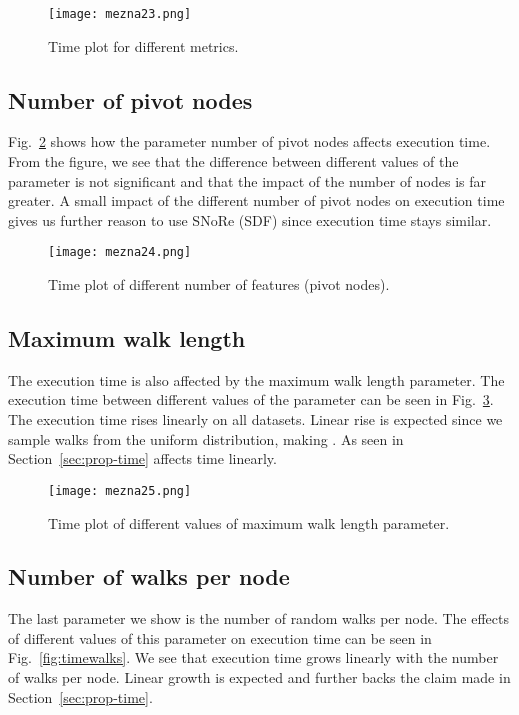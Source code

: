 \documentclass[twoside,11pt]{article}
\begin{document}
\begin{figure}[h!]
  \centering
  \texttt{[image: mezna23.png]}
  \caption{Time plot for different metrics.}
  \label{fig:timemetric}
\end{figure}

\subsection{Number of pivot nodes}
Fig.~\ref{fig:timenf} shows how the parameter number of pivot nodes affects execution time. From the figure, we see that the difference between different values of the parameter is not significant and that the impact of the number of nodes is far greater. A small impact of the different number of pivot nodes on execution time gives us further reason to use SNoRe (SDF) since execution time stays similar.

\begin{figure}[t!]
  \centering
  \texttt{[image: mezna24.png]}
  \caption{Time plot of different number of features (pivot nodes).}
  \label{fig:timenf}
\end{figure}

\subsection{Maximum walk length}
The execution time is also affected by the maximum walk length parameter. The execution time between different values of the parameter can be seen in Fig.~\ref{fig:timelength}. The execution time rises linearly on all datasets. Linear rise is expected since we sample walks from the uniform distribution, making . As seen in Section~\ref{sec:prop-time}  affects time linearly.

\begin{figure}[t!]
  \centering
  \texttt{[image: mezna25.png]}
  \caption{Time plot of different values of maximum walk length parameter.}
  \label{fig:timelength}
\end{figure}

\subsection{Number of walks per node}
The last parameter we show is the number of random walks per node. The effects of different values of this parameter on execution time can be seen in Fig.~\ref{fig:timewalks}. We see that execution time grows linearly with the number of walks per node. Linear growth is expected and further backs the claim made in Section~\ref{sec:prop-time}.
\end{document}
